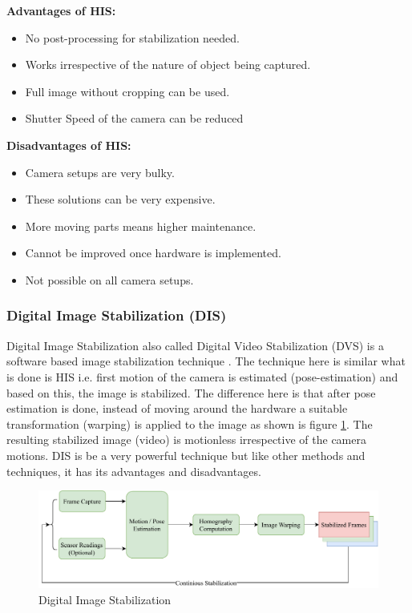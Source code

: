 \textbf{Advantages of HIS: }

\begin{itemize}
\item No post-processing for stabilization needed.
\item Works irrespective of the nature of object being captured.
\item Full image without cropping can be used.
\item Shutter Speed of the camera can be reduced
\end{itemize}

\textbf{Disadvantages of HIS:}
\begin{itemize}
\item Camera setups are very bulky.
\item These solutions can be very expensive.
\item More moving parts means higher maintenance.
\item Cannot be improved once hardware is implemented.
\item Not possible on all camera setups.
\end{itemize}

\subsubsection{Digital Image Stabilization (DIS)}
Digital Image Stabilization also called Digital Video Stabilization (DVS) is a software based image stabilization technique \citep{dis_review}. The technique here is similar what is done is HIS i.e. first motion of the camera is estimated (pose-estimation) and based on this, the image is stabilized. The difference here is that after pose estimation is done, instead of moving around the hardware a suitable transformation (warping) is applied to the image \citep{dis_feat_track} as shown is figure \ref{fig:dis}. The resulting stabilized image (video) is motionless irrespective of the camera motions. DIS is be a very powerful technique but like other methods and techniques, it has its advantages and disadvantages.

\begin{figure}[H]
\centering
\includegraphics[scale=0.6]{images/fig_chapter2/2_1_dis.pdf}
\caption{Digital Image Stabilization}
\label{fig:dis}
\end{figure}

